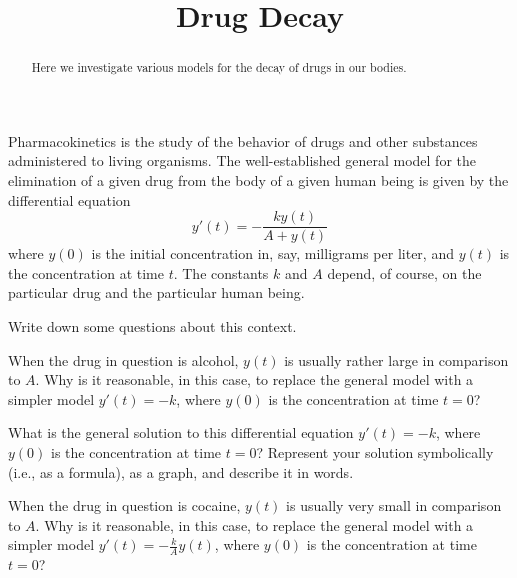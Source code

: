\documentclass[,nooutcomes]{ximera}
\title{Drug Decay}
\begin{document}
\begin{abstract}
Here we investigate various models for the decay of drugs in our bodies.  
\end{abstract}
\maketitle

Pharmacokinetics is the study of the behavior of drugs and other substances administered to living organisms.  
The well-established general model for 
the elimination of a given drug from the body of a given human being is given by the differential equation 
$$y'(t)=-\frac{ky(t)}{A+y(t)}$$
where $y(0)$ is the initial concentration in, say, milligrams per liter, and $y(t)$ is the concentration at time $t$.  The constants $k$ and $A$ depend, of course, on the particular drug and the particular human being. 

\begin{question}
Write down some questions about this context.       
\begin{freeResponse}
\end{freeResponse}
\end{question}


\begin{question}
When the drug in question is alcohol, $y(t)$ is usually rather large in comparison to $A$.   Why is it reasonable, in this case, to replace the general model with a simpler model $y'(t)=-k$, where $y(0)$ is the concentration at time $t=0$?  
\begin{freeResponse}
\end{freeResponse}
\end{question}


\begin{question}
What is the general solution to this differential equation $y'(t)=-k$, where $y(0)$ is the concentration at time $t=0$?   Represent your solution symbolically (i.e., as a formula), as a graph, and describe it in words.  
\begin{freeResponse}
\end{freeResponse}
\end{question}


\begin{question}
When the drug in question is cocaine, $y(t)$ is usually very small in comparison to $A$.   Why is it reasonable, in this case, to replace the general model with a simpler model $y'(t)=-\frac{k}{A}y(t)$, where $y(0)$ is the concentration at time $t=0$?  
\begin{freeResponse}
\end{freeResponse}
\end{question}
\end{document}
